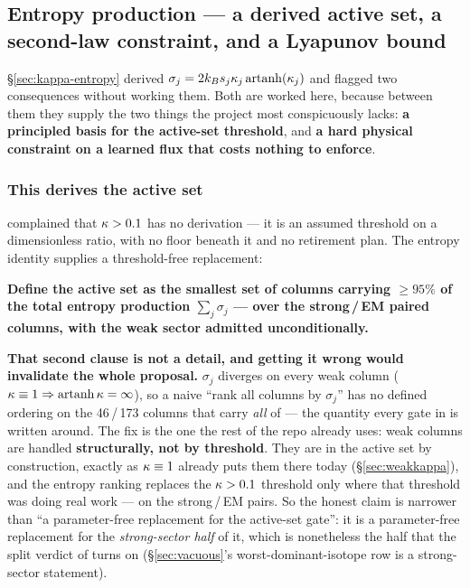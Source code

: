 \subsection{Entropy production --- a derived active set, a second-law
            constraint, and a Lyapunov bound}
\label{sec:entropy}

\S\ref{sec:kappa-entropy} derived $\sigma_j = 2k_{B} s_j\kappa_j\operatorname{artanh}(\kappa_j)$ and
flagged two consequences without working them. Both are worked here, because
between them they supply the two things the project most conspicuously lacks:
\textbf{a principled basis for the active-set threshold}, and \textbf{a hard
physical constraint on a learned flux that costs nothing to enforce}.

\subsubsection{This derives the active set}
\label{sec:entropyactive}

 complained that $\kappa > 0.1$ has no derivation --- it is an assumed
threshold on a dimensionless ratio, with no floor beneath it and no retirement
plan. The entropy identity supplies a threshold-free replacement:

\begin{invariant}
\textbf{Define the active set as the smallest set of columns carrying $\ge 95\%$
of the total entropy production $\sum_j \sigma_j$ --- over the strong\,/\,EM
paired columns, with the weak sector admitted unconditionally.}
\end{invariant}

\textbf{That second clause is not a detail, and getting it wrong would
invalidate the whole proposal.} $\sigma_j$ diverges on every weak column
($\kappa \equiv 1 \Rightarrow \operatorname{artanh}\kappa = \infty$), so a naive ``rank all
columns by $\sigma_j$'' has no defined ordering on the 46\,/\,173 columns that
carry \emph{all} of \dYe{} --- the quantity every gate in  is
written around. The fix is the one the rest of the repo already uses: weak
columns are handled \textbf{structurally, not by threshold}. They are in the
active set by construction, exactly as $\kappa \equiv 1$ already puts them there
today (\S\ref{sec:weakkappa}), and the entropy ranking replaces the
$\kappa > 0.1$ threshold only where that threshold was doing real work --- on the
strong\,/\,EM pairs. So the honest claim is narrower than ``a parameter-free
replacement for the active-set gate'': it is a parameter-free replacement for
the \emph{strong-sector half} of it, which is nonetheless the half that the
split verdict of  turns on (\S\ref{sec:vacuous}'s
worst-dominant-isotope row is a strong-sector statement).


